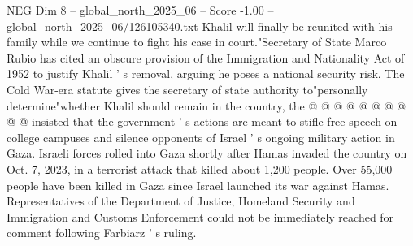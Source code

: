 \begin{textsample}{NEG Dim 8 – global\_north\_2025\_06 – Score -1.00 – global\_north\_2025\_06/126105340.txt}
Khalil will finally be reunited with his family while we continue to fight his case in court."Secretary of State Marco Rubio has cited an obscure provision of the Immigration and Nationality Act of 1952 to justify Khalil ' s removal, arguing he poses a national security risk.
The Cold War-era statute gives the secretary of state authority to"personally determine"whether Khalil should remain in the country, the @ @ @ @ @ @ @ @ @ @ insisted that the government ' s actions are meant to stifle free speech on college campuses and silence opponents of Israel ' s ongoing military action in Gaza.
Israeli forces rolled into Gaza shortly after Hamas invaded the country on Oct. 7, 2023, in a terrorist attack that killed about 1,200 people.
Over 55,000 people have been killed in Gaza since Israel launched its war against Hamas.
Representatives of the Department of Justice, Homeland Security and Immigration and Customs Enforcement could not be immediately reached for comment following Farbiarz ' s ruling.

\end{textsample}
